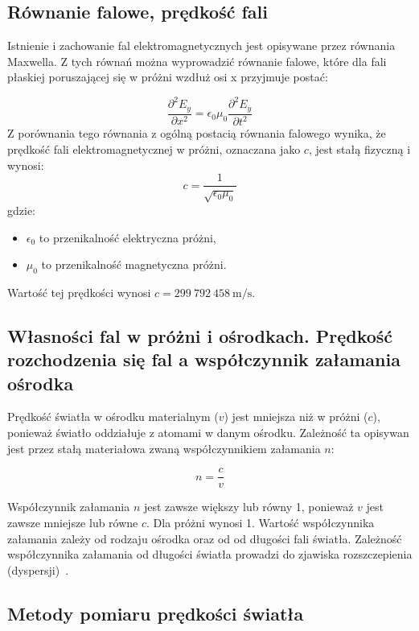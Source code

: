 \documentclass[a4paper,12pt]{article}
\begin{document}
\subsection*{Równanie falowe, prędkość fali}

Istnienie i zachowanie fal elektromagnetycznych jest opisywane przez równania Maxwella. Z tych równań można wyprowadzić równanie falowe, które dla fali płaskiej poruszającej się w próżni wzdłuż osi x przyjmuje postać:

$$
    \frac{\partial^2 E_y}{\partial x^2} = \epsilon_0 \mu_0 \frac{\partial^2 E_y}{\partial t^2}
$$
Z porównania tego równania z ogólną postacią równania falowego wynika, że prędkość fali elektromagnetycznej w próżni, oznaczana jako $c$, jest stałą fizyczną i wynosi:
$$
    c = \frac{1}{\sqrt{\epsilon_0 \mu_0}}
$$
gdzie:
\begin{itemize}
    \item $\epsilon_0$ to przenikalność elektryczna próżni,
    \item $\mu_0$ to przenikalność magnetyczna próżni.
\end{itemize}

Wartość tej prędkości wynosi $c = 299 \ 792 \ 458 \ \text{m/s}$.\citep{fizyka_dla_szkol_wyzszych_tom_3}

\subsection*{Własności fal w próżni i ośrodkach. Prędkość rozchodzenia się fal a współczynnik załamania ośrodka}

Prędkość światła w ośrodku materialnym ($v$) jest mniejsza niż w próżni ($c$), ponieważ światło oddziałuje z atomami w danym ośrodku. Zależność ta opisywan jest przez stałą materiałowa zwaną współczynnikiem załamania $n$:

$$
    n = \frac{c}{v}
$$

Współczynnik załamania $n$ jest zawsze większy lub równy 1, ponieważ $v$ jest zawsze mniejsze lub równe $c$. Dla próżni wynosi 1.
Wartość współczynnika załamania zależy od rodzaju ośrodka oraz od od długości fali światła.
Zależność współczynnika załamania od długości światła prowadzi do zjawiska rozszczepienia (dyspersji)~\citep{fizyka_dla_szkol_wyzszych_tom_3}.

\subsection*{Metody pomiaru prędkości światła}
\end{document}
